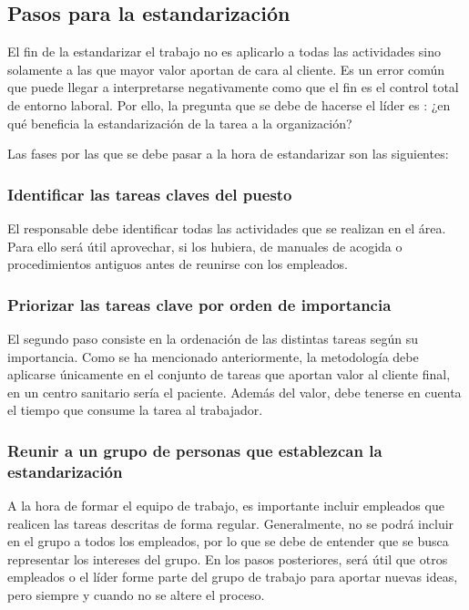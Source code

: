 \subsection{Pasos para la estandarización}

El fin de la estandarizar el trabajo no es aplicarlo a todas las actividades sino solamente a las que mayor valor aportan de cara al cliente. Es un error común que puede llegar a interpretarse negativamente como que el fin es el control total de entorno laboral. Por ello, la pregunta que se debe de hacerse el líder es : ¿en qué beneficia la estandarización de la tarea a la organización?

Las fases por las que se debe pasar a la hora de estandarizar son las siguientes:

\subsubsection{Identificar las tareas claves del puesto}

El responsable debe identificar todas las actividades que se realizan en el área.
Para ello será útil aprovechar, si los hubiera, de manuales de acogida o procedimientos antiguos antes de reunirse con los empleados.

\subsubsection{Priorizar las tareas clave por orden de importancia}

El segundo paso consiste en la ordenación de las distintas tareas según su importancia.
Como se ha mencionado anteriormente, la metodología debe aplicarse únicamente en el conjunto de tareas que aportan valor al cliente final, en un centro sanitario sería el paciente.
Además del valor, debe tenerse en cuenta el tiempo que consume la tarea al trabajador.

\subsubsection{Reunir a un grupo de personas que establezcan la estandarización}

A la hora de formar el equipo de trabajo, es importante incluir empleados que realicen las tareas descritas de forma regular.
Generalmente, no se podrá incluir en el grupo a todos los empleados, por lo que se debe de entender que se busca representar los intereses del grupo.
En los pasos posteriores, será útil que otros empleados o el líder forme parte del grupo de trabajo para aportar nuevas ideas, pero siempre y cuando no se altere el proceso.

